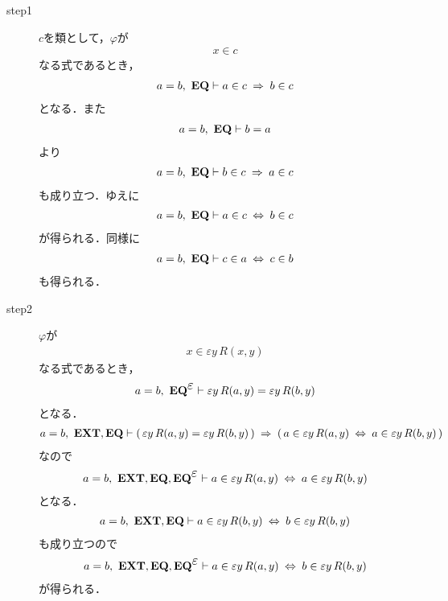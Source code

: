	\begin{sketch}\mbox{}
		\begin{description}
			\item[step1]
				$c$を類として，$\varphi$が
				\begin{align}
					x \in c
				\end{align}
				なる式であるとき，
				\begin{align}
					a = b,\ \mbox{{\bf EQ}} \vdash a \in c \hspace{0.25em}\Rightarrow\hspace{0.25em} b \in c
				\end{align}
				となる．また
				\begin{align}
					a = b,\ \mbox{{\bf EQ}} \vdash b = a
				\end{align}
				より
				\begin{align}
					a = b,\ \mbox{{\bf EQ}} \vdash b \in c \hspace{0.25em}\Rightarrow\hspace{0.25em} a \in c
				\end{align}
				も成り立つ．ゆえに
				\begin{align}
					a = b,\ \mbox{{\bf EQ}} \vdash a \in c \hspace{0.25em}\Leftrightarrow\hspace{0.25em} b \in c
				\end{align}
				が得られる．同様に
				\begin{align}
					a = b,\ \mbox{{\bf EQ}} \vdash c \in a \hspace{0.25em}\Leftrightarrow\hspace{0.25em} c \in b
				\end{align}
				も得られる．
				
			\item[step2]
				$\varphi$が
				\begin{align}
					x \in \varepsilon y\, R(x,y)
				\end{align}
				なる式であるとき，
				\begin{align}
					a = b,\ \EQAXEP \vdash \varepsilon y\, R(a,y) = \varepsilon y\, R(b,y)
				\end{align}
				となる．
				\begin{align}
					a = b,\ \mbox{{\bf EXT}},\mbox{{\bf EQ}} 
					\vdash (\, \varepsilon y\, R(a,y) = \varepsilon y\, R(b,y)\, )
					\hspace{0.25em}\Rightarrow\hspace{0.25em} (\, a \in \varepsilon y\, R(a,y) \hspace{0.25em}\Leftrightarrow\hspace{0.25em} a \in \varepsilon y\, R(b,y)\, )
				\end{align}
				なので
				\begin{align}
					a = b,\ \EXTAX,\EQAX,\EQAXEP \vdash 
					a \in \varepsilon y\, R(a,y) \lrarrow a \in \varepsilon y\, R(b,y)
				\end{align}
				となる．
				\begin{align}
					a=b,\ \mbox{{\bf EXT}},\mbox{{\bf EQ}} \vdash 
					a \in \varepsilon y\, R(b,y) \hspace{0.25em}\Leftrightarrow\hspace{0.25em} b \in \varepsilon y\, R(b,y)
				\end{align}
				も成り立つので
				\begin{align}
					a=b,\ \EXTAX,\EQAX,\EQAXEP \vdash 
					a \in \varepsilon y\, R(a,y) \lrarrow b \in \varepsilon y\, R(b,y)
				\end{align}
				が得られる．
				

\end{description}
\end{sketch}
